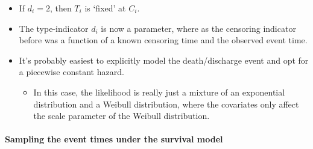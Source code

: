 \documentclass[
  10pt,
  a4paper,
]{article}
\providecommand{\tightlist}{%
  \setlength{\itemsep}{0pt}\setlength{\parskip}{0pt}}
\begin{document}
\begin{itemize}
\tightlist
\item
  If \(d_{i} = 2\), then \(T_{i}\) is `fixed' at \(C_{i}\).
\item
  The type-indicator \(d_{i}\) is now a parameter, where as the
  censoring indicator before was a function of a known censoring time
  and the observed event time.
\item
  It's probably easiest to explicitly model the death/discharge event
  and opt for a piecewise constant hazard.

  \begin{itemize}
  \tightlist
  \item
    In this case, the likelihood is really just a mixture of an
    exponential distribution and a Weibull distribution, where the
    covariates only affect the scale parameter of the Weibull
    distribution.
  \end{itemize}
\end{itemize}

\hypertarget{sampling-the-event-times-under-the-survival-model}{%
\paragraph{Sampling the event times under the survival
model}\label{sampling-the-event-times-under-the-survival-model}}
\end{document}
